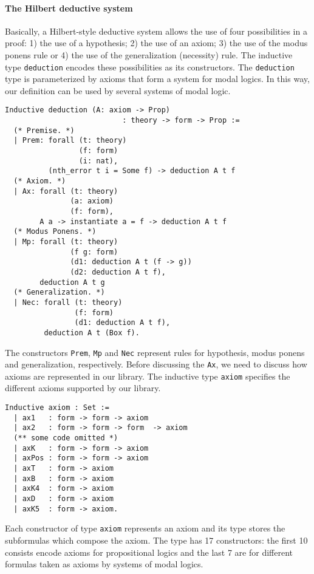 \documentclass[sigconf]{acmart}
\begin{document}
\paragraph{The Hilbert deductive system}
Basically, a Hilbert-style deductive system allows the use of four
possibilities in a proof: 1) the use of a hypothesis; 2) the use of an axiom;
3) the use of the modus ponens rule or 4) the use of the generalization (necessity)
rule. The inductive type \texttt{deduction} encodes these possibilities
as its constructors. The \texttt{deduction} type is parameterized by
axioms that form a system for modal logics. In this way, our definition can be
used by several systems of modal logic.
\begin{verbatim}
Inductive deduction (A: axiom -> Prop)
                           : theory -> form -> Prop :=
  (* Premise. *)
  | Prem: forall (t: theory)
                 (f: form)
                 (i: nat),
          (nth_error t i = Some f) -> deduction A t f
  (* Axiom. *)
  | Ax: forall (t: theory)
               (a: axiom)
               (f: form),
        A a -> instantiate a = f -> deduction A t f
  (* Modus Ponens. *)
  | Mp: forall (t: theory)
               (f g: form)
               (d1: deduction A t (f -> g))
               (d2: deduction A t f),
        deduction A t g
  (* Generalization. *)
  | Nec: forall (t: theory)
                (f: form)
                (d1: deduction A t f),
         deduction A t (Box f).
\end{verbatim}
The constructors \texttt{Prem}, \texttt{Mp} and \texttt{Nec}
represent rules for hypothesis, modus ponens and generalization, respectively.
Before discussing the \texttt{Ax}, we need to discuss how axioms are
represented in our library. The inductive type \texttt{axiom} specifies
the different axioms supported by our library.
\begin{verbatim}
Inductive axiom : Set :=
  | ax1   : form -> form -> axiom
  | ax2   : form -> form -> form  -> axiom
  (** some code omitted *)
  | axK   : form -> form -> axiom
  | axPos : form -> form -> axiom
  | axT   : form -> axiom
  | axB   : form -> axiom
  | axK4  : form -> axiom
  | axD   : form -> axiom
  | axK5  : form -> axiom.
\end{verbatim}
Each constructor of type \texttt{axiom} represents an axiom and
its type stores the subformulas which compose the axiom. The type has
17 constructors: the first 10 consists encode axioms for propositional logics
and the last 7 are for different formulas taken as axioms by systems of modal logics.
\end{document}
